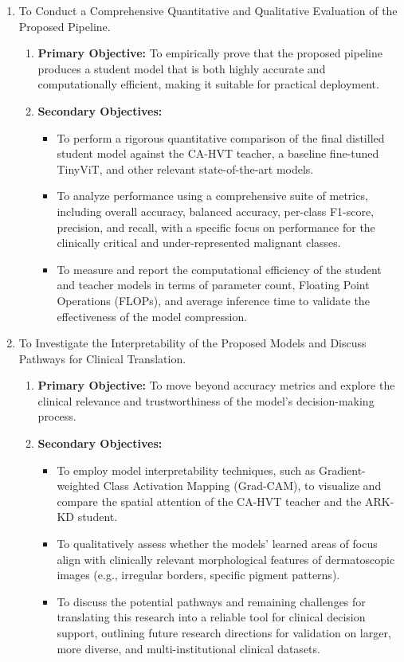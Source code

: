 \begin{enumerate}
\item To Conduct a Comprehensive Quantitative and Qualitative Evaluation of the Proposed Pipeline.
\begin{enumerate}
    \item \textbf{Primary Objective:} To empirically prove that the proposed pipeline produces a student model that is both highly accurate and computationally efficient, making it suitable for practical deployment.
    \item \textbf{Secondary Objectives:}
    \begin{itemize}
        \item To perform a rigorous quantitative comparison of the final distilled student model against the CA-HVT teacher, a baseline fine-tuned TinyViT, and other relevant state-of-the-art models.
        \item To analyze performance using a comprehensive suite of metrics, including overall accuracy, balanced accuracy, per-class F1-score, precision, and recall, with a specific focus on performance for the clinically critical and under-represented malignant classes.
        \item To measure and report the computational efficiency of the student and teacher models in terms of parameter count, Floating Point Operations (FLOPs), and average inference time to validate the effectiveness of the model compression.
    \end{itemize}
\end{enumerate}

\item To Investigate the Interpretability of the Proposed Models and Discuss Pathways for Clinical Translation.
\begin{enumerate}
    \item \textbf{Primary Objective:} To move beyond accuracy metrics and explore the clinical relevance and trustworthiness of the model's decision-making process.
    \item \textbf{Secondary Objectives:}
    \begin{itemize}
        \item To employ model interpretability techniques, such as Gradient-weighted Class Activation Mapping (Grad-CAM), to visualize and compare the spatial attention of the CA-HVT teacher and the ARK-KD student.
        \item To qualitatively assess whether the models' learned areas of focus align with clinically relevant morphological features of dermatoscopic images (e.g., irregular borders, specific pigment patterns).
        \item To discuss the potential pathways and remaining challenges for translating this research into a reliable tool for clinical decision support, outlining future research directions for validation on larger, more diverse, and multi-institutional clinical datasets.
    \end{itemize}
\end{enumerate}
\end{enumerate}
